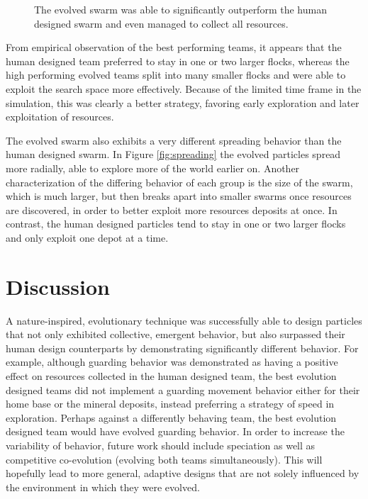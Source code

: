 \documentclass[conference,final]{IEEEtran}
\begin{document}
\begin{figure}
\begin{minipage}{0.5\textwidth}
    \caption[width=0.45\textwidth]{The evolved swarm was able to significantly outperform the human designed swarm and even managed to collect all resources.}
    \label{fig:head2head2}
\end{minipage}
\end{figure}

From empirical observation of the best performing teams, it appears that the human designed team preferred to stay in one or two larger flocks, whereas the high performing evolved teams split into many smaller flocks and were able to exploit the search space more effectively. Because of the limited time frame in the simulation, this was clearly a better strategy, favoring early exploration and later exploitation of resources.

The evolved swarm also exhibits a very different spreading behavior than the human designed swarm. In Figure \ref{fig:spreading} the evolved particles spread more radially, able to explore more of the world earlier on. Another characterization of the differing behavior of each group is the size of the swarm, which is much larger, but then breaks apart into smaller swarms once resources are discovered, in order to better exploit more resources deposits at once. In contrast, the human designed particles tend to stay in one or two larger flocks and only exploit one depot at a time.

\section{Discussion}
A nature-inspired, evolutionary technique was successfully able to design particles that not only exhibited collective, emergent behavior, but also surpassed their human design counterparts by demonstrating significantly different behavior. For example, although guarding behavior was demonstrated as having a positive effect on resources collected in the human designed team, the best evolution designed teams did not implement a guarding movement behavior either for their home base or the mineral deposits, instead preferring a strategy of speed in exploration. Perhaps against a differently behaving team, the best evolution designed team would have evolved guarding behavior. In order to increase the variability of behavior, future work should include speciation as well as competitive co-evolution (evolving both teams simultaneously). This will hopefully lead to more general, adaptive designs that are not solely influenced by the environment in which they were evolved.
\end{document}
